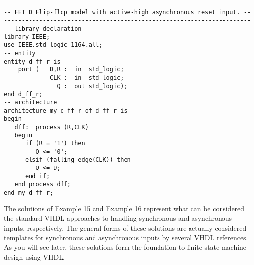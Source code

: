\noindent
\begin{minipage}{0.99\linewidth}
\begin{lstlisting}[label=exe_16, caption=Solution to Example 16.]
----------------------------------------------------------------------
-- FET D Flip-flop model with active-high asynchronous reset input. --
----------------------------------------------------------------------
-- library declaration
library IEEE;
use IEEE.std_logic_1164.all;
-- entity
entity d_ff_r is 
    port (   D,R :  in  std_logic; 
             CLK :  in  std_logic; 
               Q :  out std_logic); 
end d_ff_r;
-- architecture
architecture my_d_ff_r of d_ff_r is 
begin
   dff:  process (R,CLK)
   begin
      if (R = '1') then 
         Q <= '0'; 
      elsif (falling_edge(CLK)) then 
         Q <= D; 
      end if; 
   end process dff; 
end my_d_ff_r; 
\end{lstlisting}
\end{minipage}
  
The solutions of Example 15 and Example 16 represent what can be considered the standard VHDL approaches to handling synchronous and asynchronous inputs, respectively. The general forms of these solutions are actually considered templates for synchronous and asynchronous inputs by several VHDL references. As you will see later, these solutions form the foundation to finite state machine design using VHDL.

